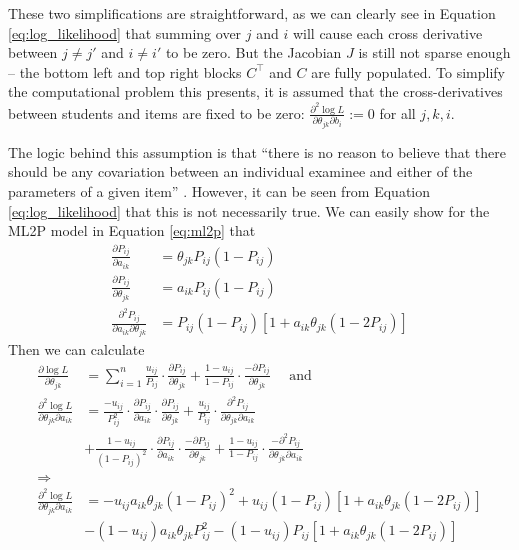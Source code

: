 These two simplifications are straightforward, as we can clearly see in Equation \ref{eq:log_likelihood} that summing over $j$ and $i$ will cause each cross derivative between $j \not = j'$ and $i \not = i'$ to be zero. But the Jacobian $J$ is still not sparse enough -- the bottom left and top right blocks $C^\top$ and $C$ are fully populated. To simplify the computational problem this presents, it is assumed that the cross-derivatives between students and items are fixed to be zero: $\frac{\partial^2 \log L}{\partial\theta_{jk} \partial b_{i}} := 0$ for all $j,k,i$. 

The logic behind this assumption is that ``there is no reason to believe that there should be any covariation between an individual examinee and either of the parameters of a given item'' \cite{baker_kim2004}. However, it can be seen from Equation \ref{eq:log_likelihood} that this is not necessarily true. We can easily show for the ML2P model in Equation \ref{eq:ml2p} that 
\begin{equation}
\begin{split}
  \frac{\partial P_{ij}}{\partial a_{ik}} &= \theta_{jk}P_{ij}(1-P_{ij}) \\
  \frac{\partial P_{ij}}{\partial \theta_{jk}} &= a_{ik}P_{ij}(1-P_{ij}) \\
  \frac{\partial^2 P_{ij}}{\partial a_{ik}\partial \theta_{jk}} &= P_{ij}(1-P_{ij})\left[ 1 + a_{ik} \theta_{jk} (1-2P_{ij}) \right]
\end{split}
\label{eq:ml2p_deriv}
\end{equation}
Then we can calculate
\begin{equation}
\begin{split}
  \frac{\partial \log L}{\partial \theta_{jk}} &= \sum_{i=1}^n  \frac{u_{ij}}{P_{ij}} \cdot \frac{\partial P_{ij}}{\partial \theta_{jk}} + \frac{1-u_{ij}}{1-P_{ij}} \cdot \frac{-\partial P_{ij}}{\partial \theta_{jk}} \quad \text{ and} \\
  \frac{\partial^2 \log L}{\partial \theta_{jk} \partial a_{ik}} &= \frac{-u_{ij}}{P_{ij}^2} \cdot \frac{\partial P_{ij}}{\partial a_{ik}} \cdot \frac{\partial P_{ij}}{\partial \theta_{jk}} + \frac{u_{ij}}{P_{ij}} \cdot \frac{\partial^2 P_{ij}}{\partial \theta_{jk}\partial a_{ik}} \\
  &+ \frac{1-u_{ij}}{(1-P_{ij})^2} \cdot \frac{\partial P_{ij}}{\partial a_{ik}} \cdot \frac{-\partial P_{ij}}{\partial \theta_{jk}} + \frac{1-u_{ij}}{1-P_{ij}} \cdot \frac{-\partial^2 P_{ij}}{\partial \theta_{jk} \partial a_{ik}} \\
  \Longrightarrow& \\
  \frac{\partial^2 \log L}{\partial \theta_{jk} \partial a_{ik}} &= -u_{ij}a_{ik}\theta_{jk}(1-P_{ij})^2 + u_{ij}(1-P_{ij})\left[1 + a_{ik}\theta_{jk}(1-2P_{ij})\right] \\
  &- (1-u_{ij})a_{ik}\theta_{jk}P_{ij}^2 - (1-u_{ij})P_{ij}\left[1 + a_{ik}\theta_{jk}(1-2P_{ij})\right]
\end{split}
  \label{eq:partial_deriv_nonzero}
\end{equation}
